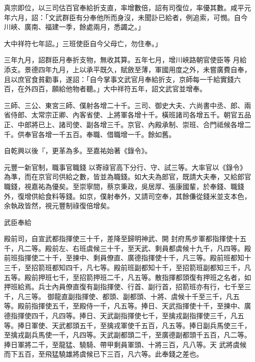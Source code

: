 \begin{pinyinscope}
 真宗即位，以三司估百官奉給折支直，率增數倍，詔有司復位，率優其數。咸平元年六月，詔：「文武群臣有分奉他所而身沒，未聞訃已給者，例追索，可憫。自今川峽、廣南、福建一季，餘處兩月，悉蠲之。」



 大中祥符七年詔。」三班使臣自今父母亡，勿住奉。」



 三年九月，詔群臣月奉折支物，無收其算。五年七月，增川峽路朝官使臣等
 月給添支。景德四年九月，上以承平既久，賦斂至薄，軍國用度之外，未嘗廣費自奉，且以庶官食貧勸事，遂詔：「自今掌事文武官月奉給折支，京師每一千給實錢六百，在外四百，願給他物者聽。」大中祥符五年，詔文武官並增奉。



 三師、三公、東宮三師、僕射各增二十千。三司、御史大夫、六尚書中丞、郎、兩省侍郎、太常宗正卿、內客省使、上將軍各增十千。橫班諸司各增五千。朝官五品正、中郎將已上、諸司使、副各增三千。京官、內殿承制、崇班、合門祗候各增二千。供奉官各增一千五百。奉職、借職增一千。餘如舊。



 自乾興以後『，更革為多。至嘉祐始著《錄令》。



 元豐一新官制，職事官職錢
 以寄祿官高下分行、守、試三等。大率官以《錄令》為準，而在京官司供給之數，皆並為職錢。如大夫為郎官，既請大夫奉，又給郎官職錢，視嘉祐為優矣。至崇寧間，蔡京秉政，吳居厚、張康國輩，於奉錢、職錢外，復增供給食料等錢。如京，僕射奉外，又請司空奉，其餘傔從錢米並支本色，余執政皆然，視元豐制祿復倍增矣。



 武臣奉給



 殿前司，自宣武都指揮使三十千，差降至歸明神武、開
 封府馬步軍都指揮使十五千，凡二等。殿前左、右班虞候三十千，至天武、剩員都虞候十九千，凡四等。殿前班指揮使二十千，至揀中、剩員僚直、廣德指揮使十千，凡三等。殿前班都知十三千，至招箭班都知四千，凡七等。殿前班副都知十千，至招箭班副都知三千，凡五等。殿前押班七千，至招箭押班二千，凡五等。散指揮都頭復有押班之名者，如押班給焉。兵士內員僚直復有副指揮使、行首、副行首，招箭班亦有行，七千至三千，凡三等。
 御龍直副指揮使、都頭、副都頭、十將、虞候十千至三千，凡五等。殿前指揮使五千，至殿侍一千，凡五等。捧日、天武指揮使十千，至揀中、廣德指揮使四千，凡四等。捧日、天武副指揮使七千，至擒戎副指揮使三千，凡五等。捧日軍使、天武都頭五千，至擒戎軍使千五百，凡五等。捧日副兵馬使三千，至擒戎副兵馬使一千，凡四等。天武副都頭二千，至廣德副都頭千五百，凡二等。捧日軍將二千，至龍猛、驍騎、帶甲剩員軍頭、十將三百，凡八等。天
 武將虞候而下五百，至飛猛驍雄將虞候已下三百，凡六等。此奉錢之差也。




\end{pinyinscope}
